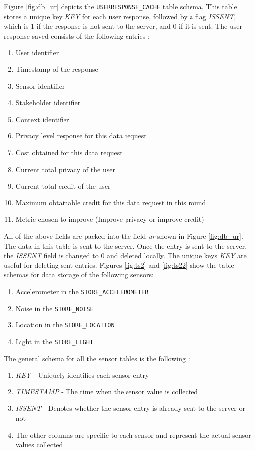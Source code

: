 Figure \ref{fig:db_ur} depicts the \texttt{USERRESPONSE\_CACHE} table schema. This table stores a unique key \textit{KEY} for each user response, followed by a flag \textit{ISSENT}, which is 1 if the response is not sent to the server, and 0 if it is sent. The user response saved consists of the following entries :

\begin{enumerate}
	\item User identifier
	\item Timestamp of the response
    \item Sensor identifier
    \item Stakeholder identifier
    \item Context identifier
    \item Privacy level response for this data request
    \item Cost obtained for this data request
    \item Current total privacy of the user
    \item Current total credit of the user
    \item Maximum obtainable credit for this data request in this round
    \item Metric chosen to improve  (Improve privacy or improve credit)
\end{enumerate}

All of the above fields are packed into the field \textit{ur} shown in Figure \ref{fig:db_ur}. The data in this table is sent to the server. Once the entry is sent to the server, the \textit{ISSENT} field is changed to 0 and deleted locally. The unique keys \textit{KEY} are useful for deleting sent entries. Figures \ref{fig:ts2} and \ref{fig:ts22} show the table schemas for data storage of the following sensors:

\begin{enumerate}
	\item Accelerometer in the \texttt{STORE\_ACCELEROMETER}
	\item Noise in the \texttt{STORE\_NOISE}
    \item Location in the  \texttt{STORE\_LOCATION}
    \item Light in the  \texttt{STORE\_LIGHT}
\end{enumerate}

The general schema for all the sensor tables is the following :

\begin{enumerate}
	\item \textit{KEY} - Uniquely identifies each sensor entry
	\item \textit{TIMESTAMP} - The time when the sensor value is collected
    \item \textit{ISSENT} - Denotes whether the sensor entry is already sent to the server or not
    \item The other columns are specific to each sensor and represent the actual sensor values collected 
\end{enumerate}

